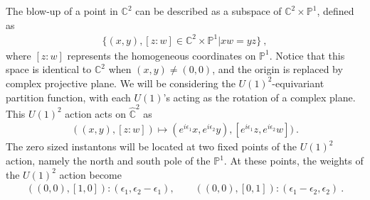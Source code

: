 \documentclass[letterpaper, 11pt]{article}
\def\IC{\mathbb{C}}
\def\IP{\mathbb{P}}
\def\e{\epsilon}
\begin{document}
 The blow-up of a point in $\IC^2$ can be described as a subspace of $\IC^2 \times \IP^1$, defined as
\begin{align}
 \{ (x, y), [z: w] \in \IC^2 \times \IP^1 | xw = yz \} \ , 
\end{align}
where $[z:w]$ represents the homogeneous coordinates on $\IP^1$. Notice that this space is identical to $\IC^2$ when $(x, y) \neq (0, 0)$, and the origin is replaced by complex projective plane. We will be considering the $U(1)^2$-equivariant partition function, with each $U(1)$'s acting as the rotation of a complex plane. This $U(1)^2$ action acts on $\hat{\IC}^2$ as
\begin{align}
 ((x, y), [z: w]) \mapsto (e^{i \e_1} x, e^{i \e_2} y), [e^{i \e_1} z, e^{i \e_2} w]) \ . 
\end{align}
The zero sized instantons will be located at two fixed points of the $U(1)^2$ action, namely the north and south pole of the $\mathbb{P}^1$. At these points, the weights of the $U(1)^2$ action become
\begin{align}
 ((0, 0), [1, 0]) : (\e_1, \e_2 - \e_1) , \qquad ((0, 0), [0, 1]): (\e_1 - \e_2, \e_2) \ . 
\end{align}
\end{document}
